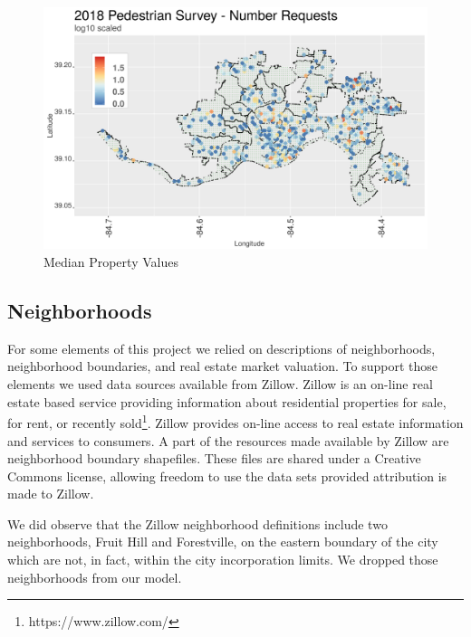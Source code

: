 \documentclass{llncs}
\begin{document}
%

\FloatBarrier
\begin{figure}
 	\includegraphics[width=\textwidth, height=\textheight, keepaspectratio]{pedestrianSurveyNRequests}
 	\caption{Median Property Values}
	\label{figure : pedestrianSurveyNRequests}
\end{figure}
\FloatBarrier


\subsection{Neighborhoods}

For some elements of this project we relied on descriptions of neighborhoods, neighborhood boundaries, and real estate market valuation. To support those elements we used data sources available from Zillow. Zillow is an on-line real estate based service providing information about residential properties for sale, for rent, or recently sold\footnote{https://www.zillow.com/}. Zillow provides on-line access to real estate information and services to consumers. A part of the resources made available by Zillow are neighborhood boundary shapefiles. These files are shared under a Creative Commons license, allowing freedom to use the data sets provided attribution is made to Zillow.

We did observe that the Zillow neighborhood definitions include two neighborhoods, Fruit Hill and Forestville, on the eastern boundary of the city which are not, in fact, within the city incorporation limits. We dropped those neighborhoods from our model.
\end{document}
